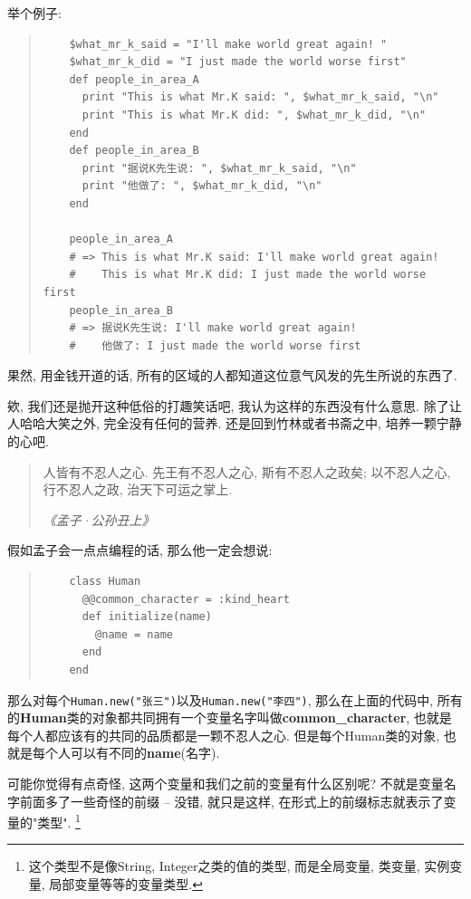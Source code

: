 举个例子: 

\begin{quotation}
  \begin{verbatim}
    $what_mr_k_said = "I'll make world great again! "
    $what_mr_k_did = "I just made the world worse first"
    def people_in_area_A
      print "This is what Mr.K said: ", $what_mr_k_said, "\n"
      print "This is what Mr.K did: ", $what_mr_k_did, "\n"
    end
    def people_in_area_B
      print "据说K先生说: ", $what_mr_k_said, "\n"
      print "他做了: ", $what_mr_k_did, "\n"
    end

    people_in_area_A
    # => This is what Mr.K said: I'll make world great again! 
    #    This is what Mr.K did: I just made the world worse first
    people_in_area_B
    # => 据说K先生说: I'll make world great again! 
    #    他做了: I just made the world worse first
  \end{verbatim}
\end{quotation}

果然, 用金钱开道的话, 所有的区域的人都知道这位意气风发的先生所说的东西了. 

欸, 我们还是抛开这种低俗的打趣笑话吧, 我认为这样的东西没有什么意思. 除了让人哈哈大笑之外, 完全没有任何的营养. 还是回到竹林或者书斋之中, 培养一颗宁静的心吧. 

\begin{quotation}
  人皆有不忍人之心. 先王有不忍人之心, 斯有不忍人之政矣; 以不忍人之心, 行不忍人之政, 治天下可运之掌上. 

  \emph{《孟子·公孙丑上》}
\end{quotation}

假如孟子会一点点编程的话, 那么他一定会想说: 

\begin{quotation}
  \begin{verbatim}
    class Human
      @@common_character = :kind_heart
      def initialize(name)
        @name = name
      end
    end
  \end{verbatim}
\end{quotation}

那么对每个\texttt{Human.new("张三")}以及\texttt{Human.new("李四")}, 那么在上面的代码中, 所有的\textbf{Human}类的对象都共同拥有一个变量名字叫做\textbf{common\_character}, 也就是每个人都应该有的共同的品质都是一颗不忍人之心. 但是每个Human类的对象, 也就是每个人可以有不同的\textbf{name}(名字). 

可能你觉得有点奇怪, 这两个变量和我们之前的变量有什么区别呢? 不就是变量名字前面多了一些奇怪的前缀 -- 没错, 就只是这样, 在形式上的前缀标志就表示了变量的"类型". \footnote{这个类型不是像String, Integer之类的值的类型, 而是全局变量, 类变量, 实例变量, 局部变量等等的变量类型. } 

